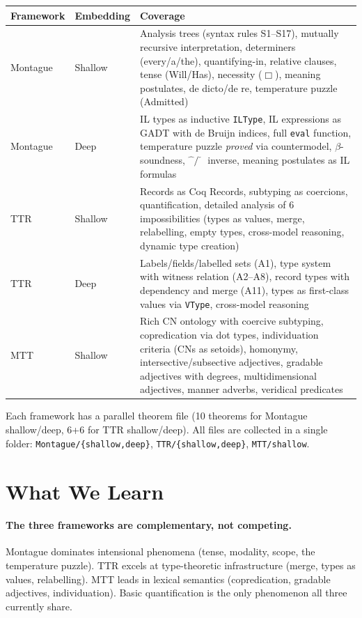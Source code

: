 \documentclass[11pt,a4paper]{article}
\begin{document}
\begin{table}[h]
\centering\small
\begin{tabular}{@{}llp{8.5cm}@{}}
\toprule
\textbf{Framework} & \textbf{Embedding} & \textbf{Coverage} \\
\midrule
Montague & Shallow & Analysis trees (syntax rules S1--S17), mutually recursive interpretation, determiners (every/a/the), quantifying-in, relative clauses, tense (Will/Has), necessity ($\Box$), meaning postulates, de dicto/de re, temperature puzzle (Admitted) \\
Montague & Deep & IL types as inductive \texttt{ILType}, IL expressions as GADT with de Bruijn indices, full \texttt{eval} function, temperature puzzle \emph{proved} via countermodel, $\beta$-soundness, $\hat{\phantom{x}}/\check{\phantom{x}}$ inverse, meaning postulates as IL formulas \\
TTR & Shallow & Records as Coq Records, subtyping as coercions, quantification, detailed analysis of 6 impossibilities (types as values, merge, relabelling, empty types, cross-model reasoning, dynamic type creation) \\
TTR & Deep & Labels/fields/labelled sets (A1), type system with witness relation (A2--A8), record types with dependency and merge (A11), types as first-class values via \texttt{VType}, cross-model reasoning \\
MTT & Shallow & Rich CN ontology with coercive subtyping, copredication via dot types, individuation criteria (CNs as setoids), homonymy, intersective/subsective adjectives, gradable adjectives with degrees, multidimensional adjectives, manner adverbs, veridical predicates \\
\bottomrule
\end{tabular}
\end{table}

Each framework has a parallel theorem file (10 theorems for Montague shallow/deep, 6+6 for TTR shallow/deep). All files are collected in a single folder: \texttt{Montague/\{shallow,deep\}}, \texttt{TTR/\{shallow,deep\}}, \texttt{MTT/shallow}.

\section{What We Learn}

\paragraph{The three frameworks are complementary, not competing.} Montague dominates intensional phenomena (tense, modality, scope, the temperature puzzle). TTR excels at type-theoretic infrastructure (merge, types as values, relabelling). MTT leads in lexical semantics (copredication, gradable adjectives, individuation). Basic quantification is the only phenomenon all three currently share.
\end{document}
